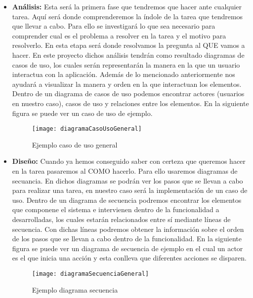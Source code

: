 \begin{itemize}
  \item \textbf{Análisis:} Esta será la primera fase que tendremos que hacer ante cualquier tarea.
     Aquí será donde comprenderemos la índole de la tarea que tendremos que llevar a cabo. Para ello
     se investigará lo que sea necesario para comprender cual es el problema a resolver en la tarea
     y el motivo para resolverlo. En esta etapa será donde resolvamos la pregunta al QUE vamos
     a hacer. En este proyecto dichos análisis tendrán como resultado diagramas de casos de uso, los
     cuales serán representarán la manera en la que un usuario interactua con la aplicación. Además
     de lo mencionado anteriormente nos ayudará a visualizar la manera y orden en la que interactuan
     los elementos. Dentro de un diagrama de casos de uso podemos encontrar actores (usuarios en nuestro caso),
     casos de uso y relaciones entre los elementos. En la siguiente figura se puede ver un caso
     de uso de ejemplo.

     \begin{figure}[htb]
       \centering
       \texttt{[image: diagramaCasoUsoGeneral]}
       \caption[Ejemplo caso de uso general]{Ejemplo caso de uso general}
       \label{fig:blancoValido}
     \end{figure}

  \item \textbf{Diseño:} Cuando ya hemos conseguido saber con certeza que queremos hacer en la tarea
     pasaremos al COMO hacerlo. Para ello usaremos diagramas de secuancia. En dichos diagramas se podrán
     ver los pasos que se llevan a cabo para realizar una tarea, en nuestro caso será la implementación de un
     caso de uso. Dentro de un diagrama de secuencia podremos encontrar los elementos que componene el sistema
     e intervienen dentro de la funcionalidad a desarrolladas, los cuales estarán relacionados entre sí mediante
     líneas de secuencia. Con dichas líneas podremos obtener la información sobre el orden de los pasos que
     se llevan a cabo dentro de la funcionalidad. En la siguiente figura se puede ver un diagrama de secuencia de
     ejemplo en el cual un actor es el que inicia una acción y esta conlleva que diferentes acciones se disparen.

     \begin{figure}[htb]
       \centering
       \texttt{[image: diagramaSecuenciaGeneral]}
       \caption[Ejemplo diagrama secuencia]{Ejemplo diagrama secuencia}
       \label{fig:blancoValido}
     \end{figure}

\end{itemize}
